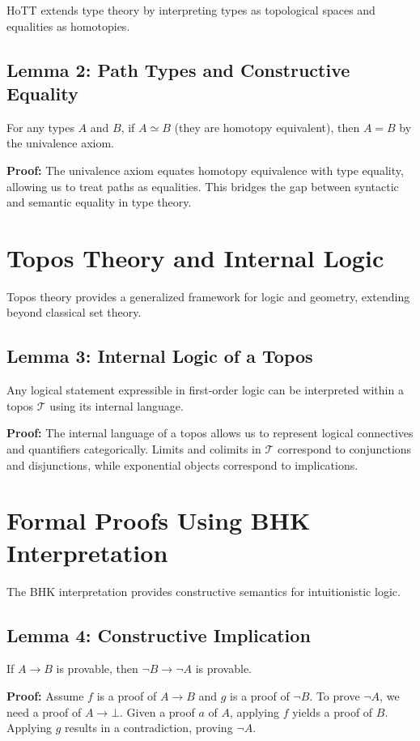 \documentclass{article}
\begin{document}
HoTT extends type theory by interpreting types as topological spaces and equalities as homotopies.

\subsection{Lemma 2: Path Types and Constructive Equality}
For any types \( A \) and \( B \), if \( A \simeq B \) (they are homotopy equivalent), then \( A = B \) by the univalence axiom.

\textbf{Proof:} The univalence axiom equates homotopy equivalence with type equality, allowing us to treat paths as equalities. This bridges the gap between syntactic and semantic equality in type theory.


\section{Topos Theory and Internal Logic}

Topos theory provides a generalized framework for logic and geometry, extending beyond classical set theory.

\subsection{Lemma 3: Internal Logic of a Topos}
Any logical statement expressible in first-order logic can be interpreted within a topos \( \mathcal{T} \) using its internal language.

\textbf{Proof:} The internal language of a topos allows us to represent logical connectives and quantifiers categorically. Limits and colimits in \( \mathcal{T} \) correspond to conjunctions and disjunctions, while exponential objects correspond to implications.


\section{Formal Proofs Using BHK Interpretation}

The BHK interpretation provides constructive semantics for intuitionistic logic.

\subsection{Lemma 4: Constructive Implication}
If \( A \rightarrow B \) is provable, then \( \neg B \rightarrow \neg A \) is provable.

\textbf{Proof:}
Assume \( f \) is a proof of \( A \rightarrow B \) and \( g \) is a proof of \( \neg B \). To prove \( \neg A \), we need a proof of \( A \rightarrow \bot \). Given a proof \( a \) of \( A \), applying \( f \) yields a proof of \( B \). Applying \( g \) results in a contradiction, proving \( \neg A \).
\end{document}
